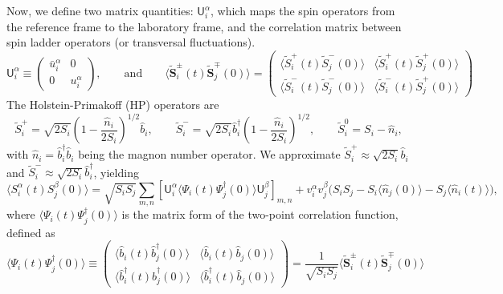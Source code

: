 Now, we define two matrix quantities: $\mathsf{U}^{\alpha}_{i}$, which maps the spin operators from the reference frame to the laboratory frame, and the correlation matrix between spin ladder operators (or transversal fluctuations).
\begin{equation}
    \mathsf{U}^{\alpha}_{i} 
    \equiv 
    \begin{pmatrix}
         \bar{u}^{\alpha}_{i} & 0 \\ 0 & u^{\alpha}_{i} 
    \end{pmatrix},
    \qquad \text{and} \qquad
    \big\langle \widetilde{\mathbf{S}}^{\pm}_{i}(t) \widetilde{\mathbf{S}}^{\mp}_{j}(0) \big\rangle
    = 
    \begin{pmatrix}
        \langle \widetilde{S}^{+}_{i}(t) \widetilde{S}^{-}_{j}(0) \rangle &
        \langle \widetilde{S}^{+}_{i}(t) \widetilde{S}^{+}_{j}(0) \rangle \\[0.25em]
        \langle \widetilde{S}^{-}_{i}(t) \widetilde{S}^{-}_{j}(0) \rangle &
        \langle \widetilde{S}^{-}_{i}(t) \widetilde{S}^{+}_{j}(0) \rangle
    \end{pmatrix}
\end{equation}
The Holstein-Primakoff (HP) operators are
\begin{equation}
    \widetilde{S}_{i}^{+} = \sqrt{2 S_i} \left( 1 - \frac{\hat{n}_i}{2 S_i} \right)^{1/2} \hat{b}_i, 
    \qquad \widetilde{S}_{i}^{-} = \sqrt{2 S_i} \hat{b}_i^{\dagger} \left( 1 - \frac{\hat{n}_i}{2 S_i} \right)^{1/2}, 
    \qquad \widetilde{S}_{i}^{0} = S_i - \hat{n}_i,
\end{equation}
with $\hat{n}_i = \hat{b}_i^{\dagger} \hat{b}_i$ being the magnon number operator.
We approximate $\widetilde{S}_{i}^{+} \approx \sqrt{2 S_i} \hat{b}_i$ and $\widetilde{S}_{i}^{-} \approx \sqrt{2 S_i} \hat{b}_i^{\dagger}$, yielding
\begin{equation}
    \langle S_i^{\alpha}(t) S_j^{\beta}(0) \rangle
    = \sqrt{S_i S_j} \sum_{m,n} \left[ 
    \mathsf{U}^{\alpha}_{i}
    \big\langle \Psi_{i}(t) \Psi_{j}^{\dagger}(0) \big\rangle
    \mathsf{U}^{\beta}_{j}
    \right]_{m,n}
    + v^{\alpha}_{i} v^{\beta}_{j} \big( S_i S_j -  S_i \langle \hat{n}_j(0) \rangle - S_j \langle \hat{n}_i(t) \rangle \big),
\end{equation}
where $\big\langle \Psi_{i}(t) \Psi_{j}^{\dagger}(0) \big\rangle$ is the matrix form of the two-point correlation function, defined as 
\begin{equation}
    \big\langle \Psi_{i}(t) \Psi_{j}^{\dagger}(0) \big\rangle
    \equiv
    \begin{pmatrix}
        \langle \hat{b}_i(t) \hat{b}_j^{\dagger}(0) \rangle &
        \langle \hat{b}_i(t) \hat{b}_j(0) \rangle \\
        \langle \hat{b}_i^{\dagger}(t) \hat{b}_j^{\dagger}(0) \rangle &
        \langle \hat{b}_i^{\dagger}(t) \hat{b}_j(0) \rangle
    \end{pmatrix}
    = \frac{1}{\sqrt{S_{i}S_{j}}}
    \big\langle \widetilde{\mathbf{S}}^{\pm}_{i}(t) \widetilde{\mathbf{S}}^{\mp}_{j}(0) \big\rangle
\end{equation}

